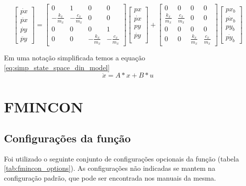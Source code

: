 \begin{equation}
    \label{eq:espaco_de_estados_din_model}
    \begin{bmatrix}
        \dot{px} \\
        \ddot{px} \\
        \dot{py} \\
        \ddot{py}
    \end{bmatrix}
    =
    \begin{bmatrix}
        0 & 1 & 0 & 0 \\
        -\frac{k_x}{m_x} & -\frac{c_x}{m_x} & 0 & 0 \\
        0 & 0 & 0 & 1 \\
        0 & 0 & -\frac{k_x}{m_x} & -\frac{c_x}{m_x}
    \end{bmatrix}
    \begin{bmatrix}
        px \\
        \dot{px} \\        
        py \\
        \dot{py} \\
    \end{bmatrix}
    +
    \begin{bmatrix}
        0 & 0 & 0 & 0 \\
        \frac{k_x}{m_x} & \frac{c_x}{m_x} & 0 & 0 \\
        0 & 0 & 0 & 0 \\
        0 & 0 & \frac{k_x}{m_x} & \frac{c_x}{m_x}
    \end{bmatrix}
    \begin{bmatrix}
        px_b \\
        \dot{px_b}  \\
        py_b \\
        \dot{py_b} 
    \end{bmatrix}
\end{equation}

Em uma notação simplificada temos a equação \ref{eq:simp_state_space_din_model}
\begin{equation}
    \label{eq:simp_state_space_din_model}
    \dot x = A*x+B*u
\end{equation}

\section{FMINCON}

\subsection{Configurações da função}
Foi utilizado o seguinte conjunto de configurações opcionais da função (tabela \ref{tab:fmincon_options}).
As configurações não indicadas se mantem na configuração padrão, que pode ser encontrada nos manuais da mesma.

